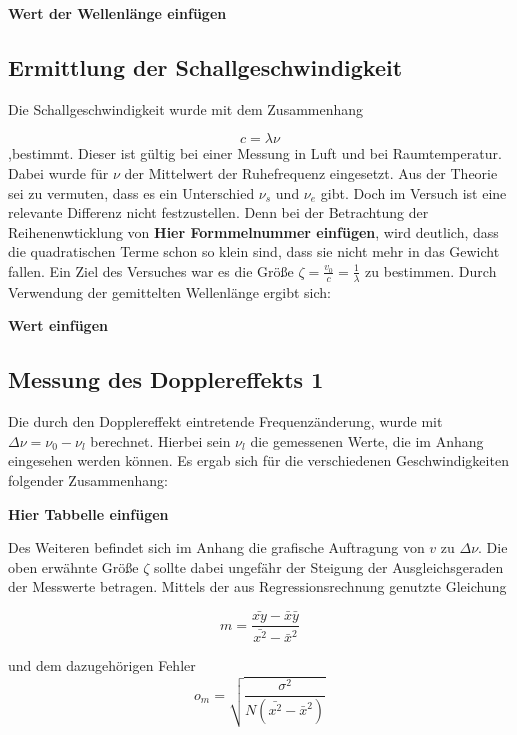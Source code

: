 \documentclass[parskip=half]{scrartcl} %
\begin{document}
\textbf{Wert der Wellenlänge einfügen}

\subsection{Ermittlung der Schallgeschwindigkeit}
Die Schallgeschwindigkeit wurde mit dem Zusammenhang

\begin{equation}
c=\lambda \nu
\end{equation}
,bestimmt. Dieser ist gültig bei einer Messung in Luft und bei Raumtemperatur.
Dabei wurde für $\nu$ der Mittelwert der Ruhefrequenz eingesetzt.
Aus der Theorie sei zu vermuten, dass es ein Unterschied $\nu_s$ und $\nu_e$ gibt.
Doch im Versuch ist eine relevante Differenz nicht festzustellen. 
Denn bei der Betrachtung der Reihenenwticklung von \textbf{Hier Formmelnummer einfügen},
wird deutlich, dass die quadratischen Terme schon so klein sind, dass sie nicht mehr in
das Gewicht fallen. Ein Ziel des Versuches war es die Größe $\zeta=\frac{v_0}{c}=\frac{1}{\lambda}$
zu bestimmen.
Durch Verwendung der gemittelten Wellenlänge ergibt sich:

\textbf{Wert einfügen}

\subsection{Messung des Dopplereffekts 1}
Die durch den Dopplereffekt eintretende Frequenzänderung, wurde 
mit $\Delta \nu=\nu_0-\nu_l$ berechnet. Hierbei sein $\nu_l$ die 
gemessenen Werte, die im Anhang eingesehen werden können.
Es ergab sich für die verschiedenen Geschwindigkeiten folgender Zusammenhang:

\textbf{Hier Tabbelle einfügen}

Des Weiteren befindet sich im Anhang die grafische Auftragung 
von $v$ zu $\Delta \nu$. 
Die oben erwähnte Größe $\zeta$ sollte dabei ungefähr der 
Steigung der Ausgleichsgeraden der Messwerte betragen.
Mittels der aus Regressionsrechnung genutzte Gleichung

\begin{equation*}
m=\frac{\bar{xy}-\bar{x}\bar{y}}{\bar{x^2}-\bar{x}^2}
\end{equation*}

und dem dazugehörigen Fehler
\begin{equation*}
o_m=\sqrt{\frac{\sigma^2}{N(\bar{x^2}-\bar{x}^2)}}
\end{equation*}
\end{document}
